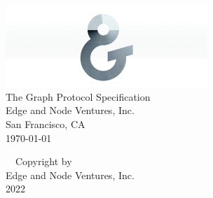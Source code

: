 \begin{titlepage}
\pagestyle{empty}
\begin{fullwidth}
\begin{center}
\vspace*{0.5 in}

\includegraphics[width=3in]{sources/frontmatter/E&N-logo.png} \\[1 in]

{\LARGE The Graph Protocol Specification }\\[0.75in]

 
Edge and Node Ventures, Inc. \\
San Francisco, CA   \\[0.5in]
 
\today 
\end{center}
\end{fullwidth}  
\newpage 
\newpage
\begin{fullwidth}
\begin{center}
\vspace*{6.75in}
\textcopyright \ \ {Copyright by } \\[10 pt]
Edge and Node Ventures, Inc.\\[10 pt]
2022 
\end{center}
\end{fullwidth}
\setcounter{page}{1}
\newpage
\begin{fullwidth}

\end{fullwidth}
\cfoot{\thepage}  
\end{titlepage}